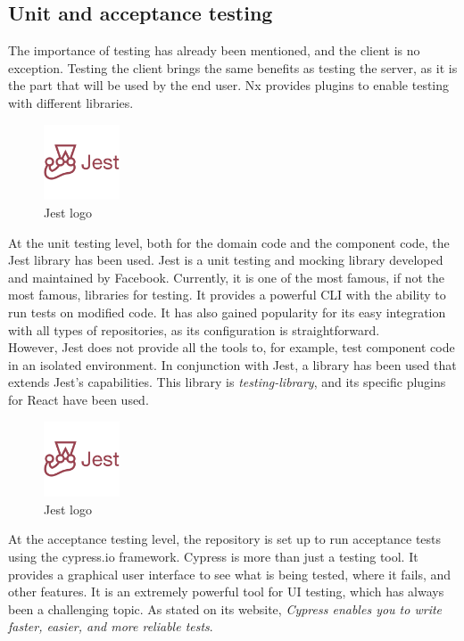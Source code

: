 \documentclass[../memory.tex]{subfiles}
\begin{document}
\subsection{Unit and acceptance testing}
The importance of testing has already been mentioned, and the client is no
exception. Testing the client brings the same benefits as testing the server, as
it is the part that will be used by the end user. Nx provides plugins to enable
testing with different libraries.
\begin{figure}[H]
	\centering
	\includegraphics[width=0.2\textwidth]{./assets/logos/jest-logo.png}
	\caption{Jest logo}
\end{figure}
At the unit testing level, both for the domain code and the component code, the
Jest library has been used. Jest is a unit testing and mocking library developed
and maintained by Facebook. Currently, it is one of the most famous, if not the
most famous, libraries for testing. It provides a powerful CLI with the ability
to run tests on modified code. It has also gained popularity for its easy
integration with all types of repositories, as its configuration is
straightforward.
\\
However, Jest does not provide all the tools to, for example, test component
code in an isolated environment. In conjunction with Jest, a library has been
used that extends Jest's capabilities. This library is \emph{testing-library},
and its specific plugins for React have been used.
\begin{figure}[H]
	\centering
	\includegraphics[width=0.2\textwidth]{./assets/logos/jest-logo.png}
	\caption{Jest logo}
\end{figure}
At the acceptance testing level, the repository is set up to run acceptance
tests using the cypress.io framework. Cypress is more than just a testing tool.
It provides a graphical user interface to see what is being tested, where it
fails, and other features. It is an extremely powerful tool for UI testing,
which has always been a challenging topic. As stated on its website,
\emph{Cypress enables you to write faster, easier, and more reliable tests}.
\end{document}
